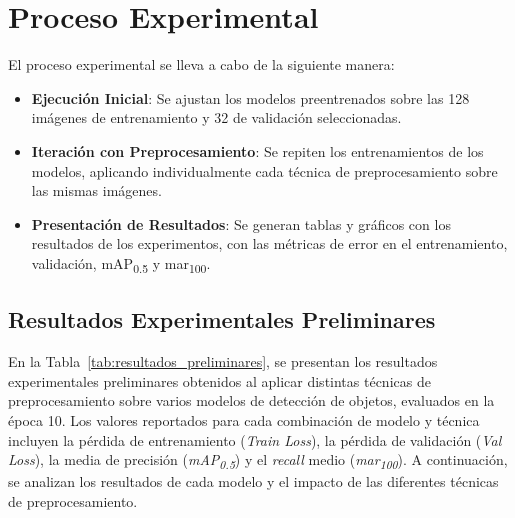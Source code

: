 \section{Proceso Experimental}
El proceso experimental se lleva a cabo de la siguiente manera:
\begin{itemize}
    \item \textbf{Ejecución Inicial}: Se ajustan los modelos preentrenados sobre las 128 imágenes de entrenamiento y 32 de validación seleccionadas.
    \item \textbf{Iteración con Preprocesamiento}: Se repiten los entrenamientos de los modelos, aplicando individualmente cada técnica de preprocesamiento sobre las mismas imágenes.
    \item \textbf{Presentación de Resultados}: Se generan tablas y gráficos con los resultados de los experimentos, con las métricas de error en el entrenamiento, validación, mAP\textsubscript{0.5} y mar\textsubscript{100}.
\end{itemize}

\subsection{Resultados Experimentales Preliminares}
En la Tabla~\ref{tab:resultados_preliminares}, se presentan los resultados experimentales preliminares obtenidos al aplicar distintas técnicas de preprocesamiento sobre varios modelos de detección de objetos, evaluados en la época 10. Los valores reportados para cada combinación de modelo y técnica incluyen la pérdida de entrenamiento (\textit{Train Loss}), la pérdida de validación (\textit{Val Loss}), la media de precisión (\textit{mAP\textsubscript{0.5}}) y el \textit{recall} medio (\textit{mar\textsubscript{100}}). A continuación, se analizan los resultados de cada modelo y el impacto de las diferentes técnicas de preprocesamiento.

